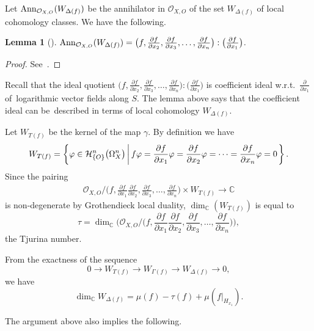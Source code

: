 \documentclass[pdftex]{sigma}%
\numberwithin{equation}{section}
\newtheorem{Lemma}[Theorem]{Lemma}
\newcommand{\Set}[1]{\left\{#1\right\}}
\newcommand{\setDef}[2]{{#1}\left|\,\vphantom{#1}{#2}\right.}%
\newcommand{\SetDef}[2]{\Set{\setDef{#1}{#2}}}
\begin{document}
Let $ {\rm Ann}_{{\mathcal O}_{X,O}}(W_{\Delta(f)}) $ be the annihilator in $ {\mathcal O}_{X,O} $ of the set $ W_{\Delta(f)} $ of local cohomology classes.
We have the following.

\begin{Lemma}[\cite{T}]
${\rm Ann}_{{\mathcal O}_{X,O}}(W_{\Delta(f)}) = \big(f, \frac{\partial f}{\partial x_2},
\frac{\partial f}{\partial x_3},\ldots,
\frac{\partial f}{\partial x_{n}}\big) : \big(\frac{\partial f}{\partial x_1}\big)$.
\end{Lemma}

\begin{proof}
See~\cite{NT16a,T,TNN}.
\end{proof}

Recall that the ideal quotient $\big(f, \frac{\partial f}{\partial x_2}, \frac{\partial f}{\partial x_3},\ldots,\frac{\partial f}{\partial x_{n}}\big) : \big(\frac{\partial f}{\partial x_1}\big)$ is coefficient ideal w.r.t.~$\frac{\partial}{\partial x_1} $ of~loga\-rithmic vector fields along $S$. The lemma above says that the coefficient ideal can be~described in terms of local cohomology $ W_{\Delta(f)}$.

Let $W_{T(f)}$ be the kernel of the map $\gamma$. By definition we have
\[
W_{T(f)} = \SetDef{\varphi \in {\mathcal H}_{\{O\}}^n\big(\Omega_X^n\big)}{f\varphi = \frac{\partial f}{\partial x_1}\varphi = \frac{\partial f}{\partial x_2}\varphi = \cdots = \frac{\partial f}{\partial x_{n}}\varphi = 0}.
\]
Since the pairing
\begin{gather*}
\displaystyle{\mathcal O}_{X,O}\Big/\!\bigg(f, \frac{\partial f}{\partial x_1} \frac{\partial f}{\partial x_2}, \frac{\partial f}{\partial x_3},\ldots,\frac{\partial f}{\partial x_{n}}\bigg) \times W_{T(f)} \longrightarrow {\mathbb C}
\end{gather*}
is non-degenerate by Grothendieck local duality,
$ \dim_{{\mathbb C}}(W_{T(f)}) $ is equal to
\[
\tau = \dim_{{\mathbb C}}\bigg( {\mathcal O}_{X,O}\Big/\!\bigg(f, \frac{\partial f}{\partial x_1} \frac{\partial f}{\partial x_2}, \frac{\partial f}{\partial x_3},\ldots,\frac{\partial f}{\partial x_{n}}\bigg)\bigg),
\]
the Tjurina number.

From the exactness of the sequence
\[
0 \longrightarrow W_{T(f)} \longrightarrow W_{\Gamma(f)} \longrightarrow W_{\Delta(f)} \longrightarrow 0,
\]
we have
\[
\dim_{{\mathbb C}}W_{\Delta(f)} = \mu(f) - \tau(f) + \mu(f|_{H_{x_1}}).
\]


The argument above also implies the following.
\end{document}
